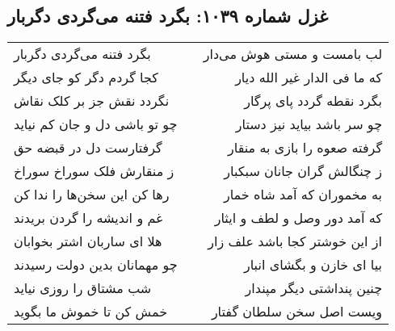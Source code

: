 \begin{center}
\section*{غزل شماره ۱۰۳۹: بگرد فتنه می‌گردی دگربار}
\label{sec:1039}
\begin{longtable}{l p{0.5cm} r}
بگرد فتنه می‌گردی دگربار
&&
لب بامست و مستی هوش می‌دار
\\
کجا گردم دگر کو جای دیگر
&&
که ما فی الدار غیر الله دیار
\\
نگردد نقش جز بر کلک نقاش
&&
بگرد نقطه گردد پای پرگار
\\
چو تو باشی دل و جان کم نیاید
&&
چو سر باشد بیاید نیز دستار
\\
گرفتارست دل در قبضه حق
&&
گرفته صعوه را بازی به منقار
\\
ز منقارش فلک سوراخ سوراخ
&&
ز چنگالش گران جانان سبکبار
\\
رها کن این سخن‌ها را ندا کن
&&
به مخموران که آمد شاه خمار
\\
غم و اندیشه را گردن بریدند
&&
که آمد دور وصل و لطف و ایثار
\\
هلا ای ساربان اشتر بخوابان
&&
از این خوشتر کجا باشد علف زار
\\
چو مهمانان بدین دولت رسیدند
&&
بیا ای خازن و بگشای انبار
\\
شب مشتاق را روزی نیاید
&&
چنین پنداشتی دیگر مپندار
\\
خمش کن تا خموش ما بگوید
&&
ویست اصل سخن سلطان گفتار
\\
\end{longtable}
\end{center}
